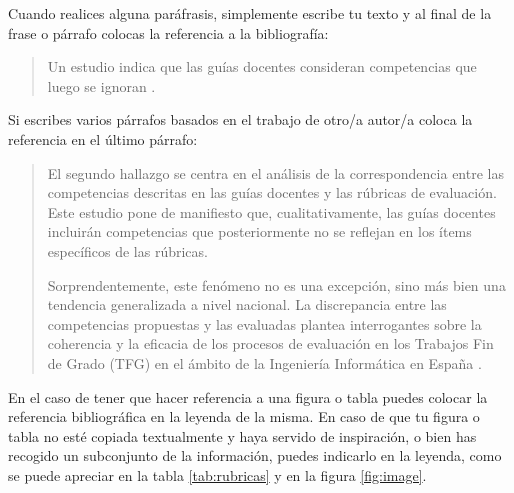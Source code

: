 Cuando realices alguna paráfrasis, simplemente escribe tu texto y al final de la frase o párrafo colocas la referencia a la bibliografía:

\begin{quote}
\begin{it}
     Un estudio indica que las guías docentes consideran competencias que luego se ignoran \cite{fernandez2023evaluacion}.
\end{it}
\end{quote}

Si escribes varios párrafos basados en el trabajo de otro/a autor/a coloca la referencia en el último párrafo:

\begin{quote}
\begin{it}
    El segundo hallazgo se centra en el análisis de la correspondencia entre las competencias descritas en las guías docentes y las rúbricas de evaluación. Este estudio pone de manifiesto que, cualitativamente, las guías docentes incluirán competencias que posteriormente no se reflejan en los ítems específicos de las rúbricas.
    
    Sorprendentemente, este fenómeno no es una excepción, sino más bien una tendencia generalizada a nivel nacional. La discrepancia entre las competencias propuestas y las evaluadas plantea interrogantes sobre la coherencia y la eficacia de los procesos de evaluación en los Trabajos Fin de Grado (TFG) en el ámbito de la Ingeniería Informática en España \cite{fernandez2023evaluacion}.
\end{it}
\end{quote}

En el caso de tener que hacer referencia a una figura o tabla puedes colocar la referencia bibliográfica en la leyenda de la misma. En caso de que tu figura o tabla no esté copiada textualmente y haya servido de inspiración, o bien has recogido un subconjunto de la información, puedes indicarlo en la leyenda, como se puede apreciar en la tabla \ref{tab:rubricas} y en la figura \ref{fig:image}.


